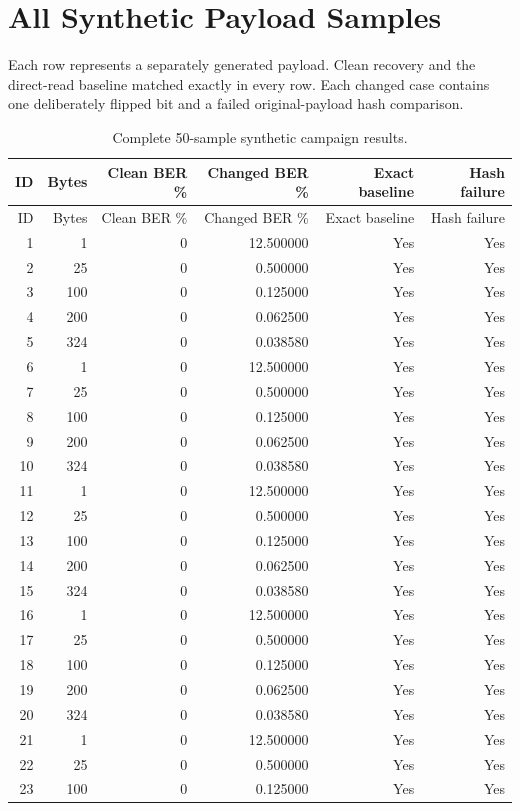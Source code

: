 \section{All Synthetic Payload Samples}
Each row represents a separately generated payload. Clean recovery and the direct-read baseline matched exactly in every row. Each changed case contains one deliberately flipped bit and a failed original-payload hash comparison.
\begin{longtable}{rrrrrr}
\caption{Complete 50-sample synthetic campaign results.}\\
\toprule ID & Bytes & Clean BER \% & Changed BER \% & Exact baseline & Hash failure\\\midrule\endfirsthead
\toprule ID & Bytes & Clean BER \% & Changed BER \% & Exact baseline & Hash failure\\\midrule\endhead
1 & 1 & 0 & 12.500000 & Yes & Yes\\
2 & 25 & 0 & 0.500000 & Yes & Yes\\
3 & 100 & 0 & 0.125000 & Yes & Yes\\
4 & 200 & 0 & 0.062500 & Yes & Yes\\
5 & 324 & 0 & 0.038580 & Yes & Yes\\
6 & 1 & 0 & 12.500000 & Yes & Yes\\
7 & 25 & 0 & 0.500000 & Yes & Yes\\
8 & 100 & 0 & 0.125000 & Yes & Yes\\
9 & 200 & 0 & 0.062500 & Yes & Yes\\
10 & 324 & 0 & 0.038580 & Yes & Yes\\
11 & 1 & 0 & 12.500000 & Yes & Yes\\
12 & 25 & 0 & 0.500000 & Yes & Yes\\
13 & 100 & 0 & 0.125000 & Yes & Yes\\
14 & 200 & 0 & 0.062500 & Yes & Yes\\
15 & 324 & 0 & 0.038580 & Yes & Yes\\
16 & 1 & 0 & 12.500000 & Yes & Yes\\
17 & 25 & 0 & 0.500000 & Yes & Yes\\
18 & 100 & 0 & 0.125000 & Yes & Yes\\
19 & 200 & 0 & 0.062500 & Yes & Yes\\
20 & 324 & 0 & 0.038580 & Yes & Yes\\
21 & 1 & 0 & 12.500000 & Yes & Yes\\
22 & 25 & 0 & 0.500000 & Yes & Yes\\
23 & 100 & 0 & 0.125000 & Yes & Yes\\

\end{longtable}
